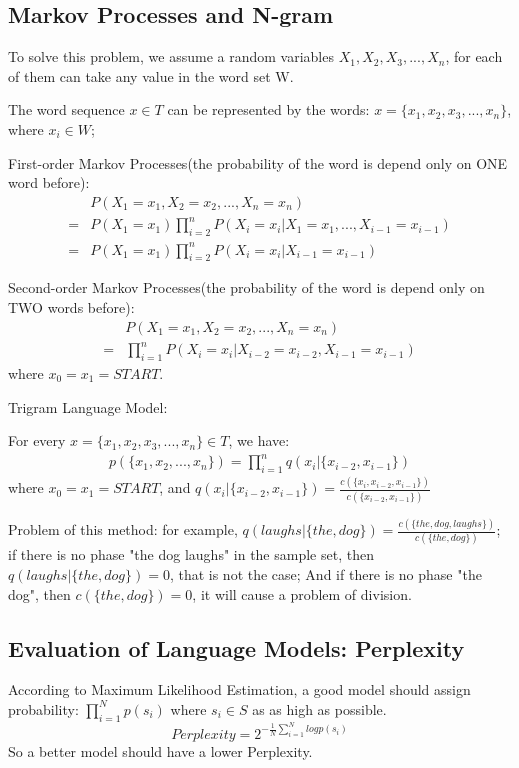 \documentclass[12pt]{article}
\numberwithin{equation}{section}
\begin{document}
\subsection{Markov Processes and N-gram}
To solve this problem, we assume a random variables $X_1, X_2, X_3, ..., X_n$, for each of them can take
any value in the word set W.

The word sequence $x \in T$ can be represented by the words: $x = \{x_1, x_2, x_3, ..., x_n\}$, where $x_i \in W$;

First-order Markov Processes(the probability of the word is depend only on ONE word before):
\begin{align*}
&P(X_1=x_1, X_2=x_2, ..., X_n=x_n)\\ 
=&P(X_1=x_1)\prod_{i=2}^{n}P(X_i=x_i|X_1=x_1, ..., X_{i-1}=x_{i-1})\\ 
=&P(X_1=x_1)\prod_{i=2}^{n}P(X_i=x_i|X_{i-1}=x_{i-1}) 
\end{align*}

Second-order Markov Processes(the probability of the word is depend only on TWO words before):
\begin{align*}
&P(X_1=x_1, X_2=x_2, ..., X_n=x_n)\\ 
=&\prod_{i=1}^{n}P(X_i=x_i|X_{i-2}=x_{i-2}, X_{i-1}=x_{i-1}) 
\end{align*}
where $x_0=x_1=START$.

Trigram Language Model:

For every $x = \{x_1, x_2, x_3, ..., x_n\} \in T$, we have:
\begin{align*}
p(\{x_1, x_2, ..., x_n\})=\prod_{i=1}^{n}q(x_i|\{x_{i-2}, x_{i-1}\}) 
\end{align*}
where $x_0=x_1=START$, and $q(x_i|\{x_{i-2}, x_{i-1}\})=\frac{c(\{x_i, x_{i-2}, x_{i-1}\})}{c(\{x_{i-2}, x_{i-1}\})}$

Problem of this method: for example, $q(laughs|\{the, dog\})=\frac{c(\{the, dog, laughs\})}{c(\{the, dog\})}$; if there is no phase "the dog laughs" in the sample set, then $q(laughs|\{the, dog\})=0$, that is not the case; And if there is no phase "the dog", then $c(\{the, dog\})=0$, it will cause a problem of division.

\subsection{Evaluation of Language Models: Perplexity}
According to Maximum Likelihood Estimation, a good model should assign probability: $\prod_{i=1}^{N}p(s_i)$ where $s_i \in S$ as as high as possible.
\[
Perplexity=2^{-\frac{1}{N}\sum_{i=1}^{N}log p(s_i)}
\]
So a better model should have a lower Perplexity.


\renewcommand\refname{Reference}



  \clearpage
\end{document}
